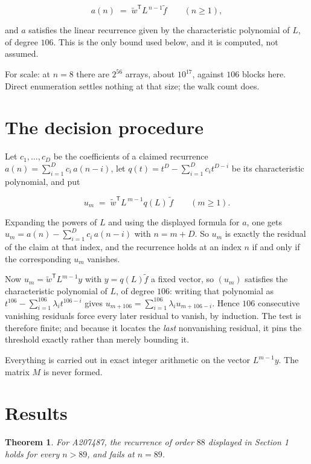 \documentclass[11pt]{article}
\newtheorem{theorem}{Theorem}
\theoremstyle{definition}
\begin{document}
\[a(n) \;=\; \tilde w^{\mathsf T} L^{\,n-1} \tilde f \qquad (n \ge 1),\]

and $a$ satisfies the linear recurrence given by the characteristic polynomial of $L$, of degree $106$. This is the only bound used below, and it is computed, not assumed.

For scale: at $n = 8$ there are $2^{56}$ arrays, about $10^{17}$, against $106$ blocks here. Direct enumeration settles nothing at that size; the walk count does.

\section{The decision procedure}

Let $c_1,\dots,c_D$ be the coefficients of a claimed recurrence $a(n) = \sum_{i=1}^{D} c_i\,a(n-i)$, let $q(t) = t^{D} - \sum_{i=1}^{D} c_i t^{D-i}$ be its characteristic polynomial, and put

\[u_m \;=\; \tilde w^{\mathsf T} L^{\,m-1} q(L)\,\tilde f \qquad (m \ge 1).\]

Expanding the powers of $L$ and using the displayed formula for $a$, one gets $u_m = a(n) - \sum_{i=1}^{D} c_i\,a(n-i)$ with $n = m + D$. So $u_m$ is exactly the residual of the claim at that index, and the recurrence holds at an index $n$ if and only if the corresponding $u_m$ vanishes.

Now $u_m = \tilde w^{\mathsf T} L^{m-1} y$ with $y = q(L)\tilde f$ a fixed vector, so $(u_m)$ satisfies the characteristic polynomial of $L$, of degree $106$: writing that polynomial as $t^{106} - \sum_{i=1}^{106} \lambda_i t^{106-i}$ gives $u_{m+106} = \sum_{i=1}^{106} \lambda_i u_{m+106-i}$. Hence $106$ consecutive vanishing residuals force every later residual to vanish, by induction. The test is therefore finite; and because it locates the {\itshape last} nonvanishing residual, it pins the threshold exactly rather than merely bounding it.

Everything is carried out in exact integer arithmetic on the vector $L^{m-1}y$. The matrix $M$ is never formed.

\section{Results}

\begin{theorem} For A207487, the recurrence of order $88$ displayed in Section 1 holds for every $n > 89$, and fails at $n = 89$.\end{theorem}
\end{document}
